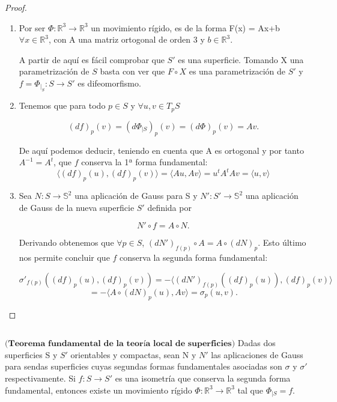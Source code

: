 \begin{proof}
	${ }$%
	\begin{enumerate}
		\item Por ser $ \Phi : \mathbb{R}^3 \to \mathbb{R}^3 $ un movimiento rígido, es de la forma F(x) = Ax+b $\forall x \in \mathbb{R}^3$, con A una matriz ortogonal de orden 3 y $b \in \mathbb{R}^3$.
		
		A partir de aquí es fácil comprobar que $S'$ es una superficie. Tomando X una parametrización de $S$ basta con ver que $F\circ X$ es una parametrización de $S'$ y $f = \Phi_{\mid_{S}} : S \to S'$ es difeomorfismo.
		
		
		\item Tenemos que para todo $p \in S$ y $\forall u, v \in T_p S$
		
		\[
		(df)_p(v) = (d\Phi_{\mid S})_p(v) = (d\Phi)_p(v) = Av.
		\]
		
		De aquí podemos deducir, teniendo en cuenta que A es ortogonal y por tanto $A^{-1} = A^t$, que $f$ conserva la 1ª forma fundamental:
		\[
		\langle (df)_p(u), (df)_p(v) \rangle = \langle Au, Av \rangle = u^tA^tAv = \langle u, v \rangle
		\]
		
		\item Sea $N : S \to \mathbb{S}^2$ una aplicación de Gauss para S y $N' : S' \to \mathbb{S}^2$ una aplicación de Gauss de la nueva superficie $S'$ definida por
		
		\[
		N'\circ f = A\circ N.
		\]
		
		Derivando obtenemos que $\forall p \in S$,  $(dN')_{f(p)}\circ A = A \circ (dN)_p$. Esto último nos permite concluir que $f$ conserva la segunda forma fundamental:
		
		\[
		\sigma'_{f(p)}((df)_p(u), (df)_p(v)) = - \langle (dN')_{f(p)}((df)_p(u)), (df)_p(v) \rangle
		\]
		\[
		= - \langle A\circ(dN)_p(u), Av \rangle = \sigma_p(u, v).
		\]
	\end{enumerate}
\end{proof}
${ }$\\

\begin{teorema} \label{teo:rig2}
	$\textbf{(Teorema fundamental de la teoría local de superficies)}$ Dadas dos superficies S y $S'$ orientables y compactas, sean N y $N'$ las aplicaciones de Gauss para sendas superficies cuyas segundas formas fundamentales asociadas son $\sigma$ y $\sigma'$ respectivamente.
	Si $f : S \to S'$ es una isometría que conserva la segunda forma fundamental, entonces existe un movimiento rígido $\Phi : \mathbb{R}^3 \to \mathbb{R}^3$ tal que $\Phi_{\mid S} = f$.
\end{teorema}

